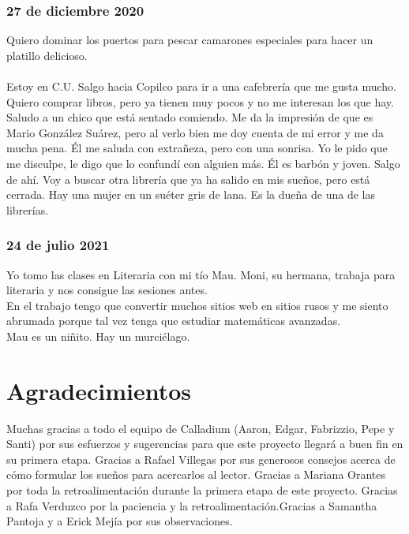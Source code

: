 \documentclass[12pt]{book}
\begin{document}
\subsection*{\hfill27 de diciembre 2020}
Quiero dominar los puertos para pescar camarones especiales para hacer un platillo delicioso.
\\
\\
Estoy en C.U. Salgo hacia Copilco para ir a una cafebrería que me gusta mucho. Quiero comprar libros, pero ya tienen muy pocos y no me interesan los que hay. Saludo a un chico que está sentado comiendo. Me da la impresión de que es Mario González Suárez, pero al verlo bien me doy cuenta de mi error y me da mucha pena. Él me saluda con extrañeza, pero con una sonrisa. Yo le pido que me disculpe, le digo que lo confundí con alguien más. Él es barbón y joven.
Salgo de ahí. Voy a buscar otra librería que ya ha salido en mis sueños, pero está cerrada. Hay una mujer en un suéter gris de lana. Es la dueña de una de las librerías.

\subsection*{\hfill 24 de julio 2021}
Yo tomo las clases en Literaria con mi tío Mau. Moni, su hermana, trabaja para literaria y nos consigue las sesiones antes. \\
En el trabajo tengo que convertir muchos sitios web en sitios rusos y me siento abrumada porque tal vez tenga que estudiar matemáticas avanzadas.\\
Mau es un niñito. Hay un murciélago.


\newpage
\chapter*{Agradecimientos}
\thispagestyle{empty}
Muchas gracias a todo el equipo de Calladium (Aaron, Edgar, Fabrizzio, Pepe y Santi) por sus esfuerzos y sugerencias para que este proyecto llegará a buen fin en su primera etapa. Gracias a Rafael Villegas por sus generosos consejos acerca de cómo formular los sueños para acercarlos al lector. Gracias a Mariana Orantes por toda la retroalimentación durante la primera etapa de este proyecto. Gracias a Rafa Verduzco por la paciencia y la retroalimentación.Gracias a Samantha Pantoja y a Erick Mejía por sus observaciones.

\newpage
\thispagestyle{empty}
\end{document}
